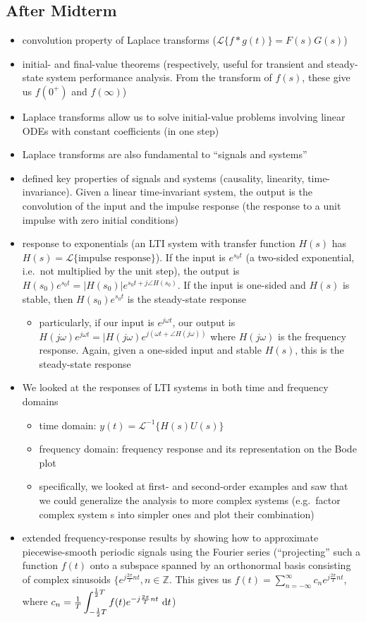 \documentclass[12pt]{article}
\begin{document}
\subsection{After Midterm}
\begin{itemize}
\item convolution property of Laplace transforms ($\mathcal{L} \{ f * g(t) \} = F(s)G(s)$)
\item initial- and final-value theorems (respectively, useful for transient and steady-state system performance analysis. From the transform of $f(s)$, these give us $f(0^+)$ and $f(\infty)$)
\item Laplace transforms allow us to solve initial-value problems involving linear ODEs with constant coefficients (in one step)
\item Laplace transforms are also fundamental to ``signals and systems''
\item defined key properties of signals and systems (causality, linearity, time-invariance). Given a linear time-invariant system, the output is the convolution of the input and the impulse response (the response to a unit impulse with zero initial conditions)
\item response to exponentials (an LTI system with transfer function $H(s)$ has $H(s) = \mathcal{L} \{ \text{impulse response} \}$). If the input is $e^{s_0 t}$ (a two-sided exponential, i.e.\ not multiplied by the unit step), the output is $H(s_0) e^{s_0 t} = |H(s_0)| e^{s_0 t + j\angle H(s_0)}$. If the input is one-sided and $H(s)$ is stable, then $H(s_0) e^{s_0 t}$ is the steady-state response
\begin{itemize}
\item particularly, if our input is $e^{j\omega t}$, our output is $H(j\omega)e^{j\omega t} = |H(j\omega) e^{j(\omega t + \angle H(j\omega))}$ where $H(j\omega)$ is the frequency response. Again, given a one-sided input and stable $H(s)$, this is the steady-state response
\end{itemize}
\item We looked at the responses of LTI systems in both time and frequency domains
\begin{itemize}
\item time domain: $y(t) = \mathcal{L}^{-1} \{ H(s) U(s) \}$
\item frequency domain: frequency response and its representation on the Bode plot
\item specifically, we looked at first- and second-order examples and saw that we could generalize the analysis to more complex systems (e.g.\ factor complex system s into simpler ones and plot their combination)
\end{itemize}
\item extended frequency-response results by showing how to approximate piecewise-smooth periodic signals using the Fourier series (``projecting'' such a function $f(t)$ onto a subspace spanned by an orthonormal basis consisting of complex sinusoids $\{ e^{j\frac{2\pi}{T}nt}, n\in\mathbb{Z}$. This gives us $f(t) = \displaystyle\sum_{n=-\infty}^\infty c_n e^{j\frac{2\pi}{T}nt}$, where $c_n = \frac{1}{T}\displaystyle\int_{-\frac{1}{2} T}^{\frac{1}{2} T} f(t) e^{-j\frac{2\pi}{T}nt} \ {\rm d} t$)
\end{itemize}
\end{document}
